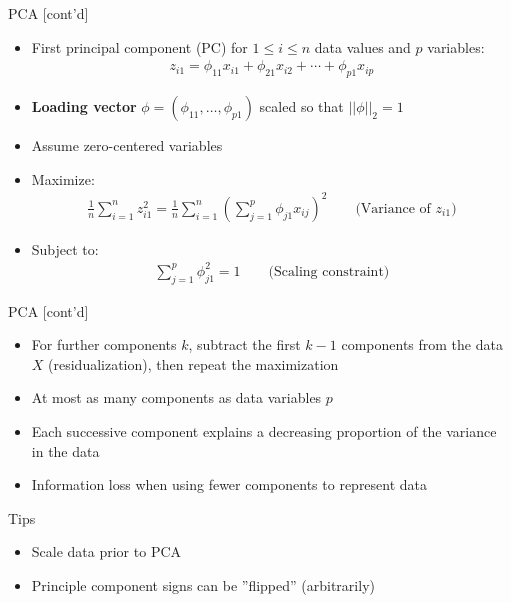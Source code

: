 \documentclass[ignorenonframetext,xcolor=x11names]{beamer}
\begin{document}
\begin{frame}{PCA \small [cont'd]}
\begin{itemize}
\item First principal component (PC) for $1 \leq i \leq n$ data values and $p$ variables:
\begin{align*}
z_{i1} = \phi_{11} x_{i1} + \phi_{21} x_{i2} + \cdots + \phi_{p1} x_{ip}
\end{align*}
\item \textbf{Loading vector} $\phi = (\phi_{11}, \ldots , \phi_{p1})$ scaled so that $||\phi||_2 = 1$
\item Assume zero-centered variables
\item Maximize:
\begin{align*}
\frac{1}{n} \sum_{i=1}^n z_{i1}^2 = \frac{1}{n}\sum_{i=1}^n \left( \sum_{j=1}^p \phi_{j1}x_{ij} \right)^2 \qquad \text{(Variance of $z_{i1}$)} 
\end{align*}
\item Subject to:
\begin{align*}
\sum_{j=1}^p \phi_{j1}^2 = 1 \qquad \text{(Scaling constraint)}
\end{align*}
\end{itemize}
\end{frame}

\begin{frame}{PCA \small [cont'd]}
\begin{itemize}
\item For further components $k$, subtract the first $k-1$ components from the data $X$ (residualization), then repeat the maximization
\item At most as many components as data variables $p$
\item Each successive component explains a decreasing proportion of the variance in the data
\item Information loss when using fewer components to represent data
\end{itemize}
\begin{block}{Tips}
\begin{itemize}
  \item Scale data prior to PCA
  \item Principle component signs can be ''flipped'' (arbitrarily)
\end{itemize}
\end{block}
\end{frame}
\end{document}

